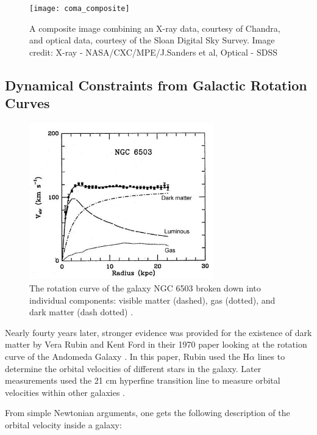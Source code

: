 \begin{figure}[h]
\texttt{[image: coma\_composite]}
\centering
\caption{A composite image combining an X-ray data, courtesy of Chandra, and optical data, courtesy of the Sloan Digital Sky Survey.  Image credit: X-ray - NASA/CXC/MPE/J.Sanders et al, Optical - SDSS}
\end{figure}
	
	
\subsection{Dynamical Constraints from Galactic Rotation Curves}	
	


\begin{figure}[b]
	\centering
	\includegraphics[width=8cm]{ngc_6503_rotation_curve}
	\caption{The rotation curve of the galaxy NGC 6503 broken down into individual components: visible matter (dashed), gas (dotted), and dark matter (dash dotted) \cite{Begeman1991}. }
	\label{fig:galactic_rotation_curve}
\end{figure}

	
Nearly fourty years later, stronger evidence was provided for the existence of dark matter by Vera Rubin and Kent Ford in their 1970 paper looking at the rotation curve of the Andomeda Galaxy \cite{rubin1970rotation}.  In this paper, Rubin used the H$\alpha$ lines to determine the orbital velocities of different stars in the galaxy.  Later measurements used the 21 cm hyperfine transition line to measure orbital velocities within other galaxies \cite{Begeman1991}.
	
	From simple Newtonian arguments, one gets the following description of the orbital velocity inside a galaxy:
	
